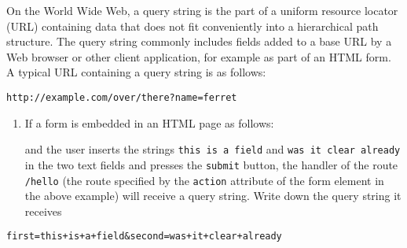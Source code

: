 On the World Wide Web, a query string is the part of a uniform resource
locator (URL) containing data that does not fit conveniently into a
hierarchical path structure. The query string commonly includes fields
added to a base URL by a Web browser or other client application, for
example as part of an HTML form. A typical URL containing a query string
is as follows:

\begin{verbatim}
http://example.com/over/there?name=ferret
\end{verbatim}

\begin{enumerate}
\def\labelenumi{\arabic{enumi}.}
\setcounter{enumi}{8}
\item
  If a form is embedded in an HTML page as follows:

\begin{Shaded}
\begin{Highlighting}[]
\KeywordTok{>}
   \KeywordTok{/>}
   \KeywordTok{/>}
   \KeywordTok{/>}
\end{Highlighting}
\end{Shaded}

  and the user inserts the strings \texttt{this is a field} and
  \texttt{was it clear already} in the two text fields and presses the
  \texttt{submit} button, the handler of the route \texttt{/hello} (the
  route specified by the \texttt{action} attribute of the form element
  in the above example) will receive a query string. Write down the
  query string it receives
\end{enumerate}

\begin{verbatim}
first=this+is+a+field&second=was+it+clear+already
\end{verbatim}
